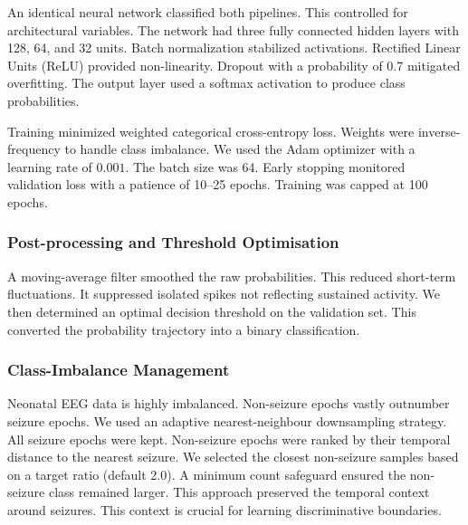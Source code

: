 \documentclass[pdflatex,sn-mathphys-num]{sn-jnl}%
\theoremstyle{thmstyleone}%
\theoremstyle{thmstyletwo}%
\theoremstyle{thmstylethree}%
\begin{document}
An identical neural network classified both pipelines. This controlled for architectural variables. The network had three fully connected hidden layers with 128, 64, and 32 units. Batch normalization stabilized activations. Rectified Linear Units (ReLU) provided non-linearity. Dropout with a probability of 0.7 mitigated overfitting. The output layer used a softmax activation to produce class probabilities.

Training minimized weighted categorical cross-entropy loss. Weights were inverse-frequency to handle class imbalance. We used the Adam optimizer with a learning rate of $0.001$. The batch size was 64. Early stopping monitored validation loss with a patience of 10--25 epochs. Training was capped at 100 epochs.

\subsubsection{Post-processing and Threshold Optimisation}

A moving-average filter smoothed the raw probabilities. This reduced short-term fluctuations. It suppressed isolated spikes not reflecting sustained activity. We then determined an optimal decision threshold on the validation set. This converted the probability trajectory into a binary classification.

\subsubsection{Class-Imbalance Management}

Neonatal EEG data is highly imbalanced. Non-seizure epochs vastly outnumber seizure epochs. We used an adaptive nearest-neighbour downsampling strategy. All seizure epochs were kept. Non-seizure epochs were ranked by their temporal distance to the nearest seizure. We selected the closest non-seizure samples based on a target ratio (default 2.0). A minimum count safeguard ensured the non-seizure class remained larger. This approach preserved the temporal context around seizures. This context is crucial for learning discriminative boundaries.




\end{document}
